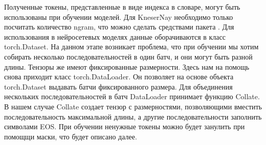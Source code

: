 Полученные токены, представленные в виде индекса в словаре, могут быть использованы при обучении моделей. Для KneserNay необходимо только посчитать количество ngram, что можно сделать средствами пакета . Для использования в нейросетевых моделях данные оборачиваются в класс torch.Dataset. На данном этапе возникает проблема, что при обучении мы хотим собирать несколько последовательностей в один батч, и они могут быть разной длины. Тензоры же имеют фиксированные размерности. Здесь нам на помощь снова приходит класс torch.DataLoader. Он позволяет на основе объекта torch.Dataset выдавать батчи фиксированного размера. Для объединения нескольких последовательностей в батч DataLoader принимает функцию Collate. В нашем случае Collate создает тензор с размерностями, позволяющими вместить последовательность максимальной длины, а другие последовательности заполнить символами EOS. При обучении ненужные токены можно будет занулить при помощщи маски, что будет описано далее.




